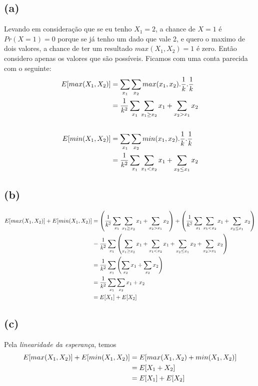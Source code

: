 \documentclass{article}
\begin{document}
\subsection*{(a)}
Levando em consideração que se eu tenho $X_1 = 2$, a chance de $X = 1$ é $Pr(X=1) = 0$
porque se já tenho um dado que vale 2, e quero o maximo de dois valores, a chance de 
ter um resultado $max(X_1,X_2) = 1$ é zero. Então considero apenas os valores que
são possíveis. Ficamos com uma conta parecida com o seguinte:
\begin{equation}
\notag
    \begin{split}
        E[max(X_1,X_2)] &= \sum\limits_{x_1}\sum\limits_{x_2}max(x_1, x_2).\dfrac{1}{k}.\dfrac{1}{k}\\
        &= \dfrac{1}{k^2}\sum\limits_{x_1}\sum\limits_{x_1 \geq x_2}x_1 + \sum\limits_{x_2 > x_1}x_2\\
        &\\
        E[min(X_1,X_2)] &= \sum\limits_{x_1}\sum\limits_{x_2}min(x_1, x_2).\dfrac{1}{k}.\dfrac{1}{k}\\
        &= \dfrac{1}{k^2}\sum\limits_{x_1}\sum\limits_{x_1 < x_2}x_1 + \sum\limits_{x_2 \leq x_1}x_2
    \end{split}
\end{equation}
\subsection*{(b)}

\begin{equation}
\notag
    \begin{split}
        E[max(X_1,X_2)] + E[min(X_1,X_2)] &= \left(\dfrac{1}{k^2}\sum\limits_{x_1}\sum\limits_{x_1 \geq x_2}x_1 + \sum\limits_{x_2 > x_1}x_2\right) + \left(\dfrac{1}{k^2}\sum\limits_{x_1}\sum\limits_{x_1 < x_2}x_1 + \sum\limits_{x_2 \leq x_1}x_2\right)\\
        &=  \dfrac{1}{k^2}\sum\limits_{x_1}\left(\sum\limits_{x_1 \geq x_2}x_1+ \sum\limits_{x_1 < x_2}x_1 + \sum\limits_{x_2 \leq x_1}x_2 + \sum\limits_{x_2 > x_1}x_2 \right)\\
        &= \dfrac{1}{k^2}\sum\limits_{x_1}\left(\sum\limits_{x_2 }x_1 + \sum\limits_{x_2}x_2\right)\\
        &= \dfrac{1}{k^2}\sum\limits_{x_1}\sum\limits_{x_2}x_1 + x_2\\
        &= E[X_1] + E[X_2]
    \end{split}
\end{equation}
\subsection*{(c)}
Pela \textit{linearidade da esperança}, temos
\begin{equation}
\notag
    \begin{split}
        E[max(X_1,X_2)] + E[min(X_1,X_2)] &= E[max(X_1,X_2) + min(X_1,X_2)]\\
        &= E[X_1 + X_2]\\
        &= E[X_1] + E[X_2]
    \end{split}
\end{equation}
\end{document}
